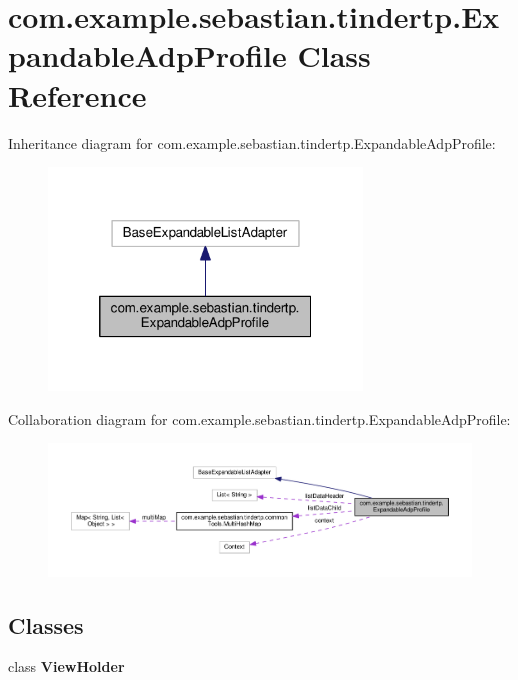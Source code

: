 \hypertarget{classcom_1_1example_1_1sebastian_1_1tindertp_1_1ExpandableAdpProfile}{}\section{com.\+example.\+sebastian.\+tindertp.\+Expandable\+Adp\+Profile Class Reference}
\label{classcom_1_1example_1_1sebastian_1_1tindertp_1_1ExpandableAdpProfile}


Inheritance diagram for com.\+example.\+sebastian.\+tindertp.\+Expandable\+Adp\+Profile\+:\nopagebreak
\begin{figure}[H]
\begin{center}
\leavevmode
\includegraphics[width=236pt]{classcom_1_1example_1_1sebastian_1_1tindertp_1_1ExpandableAdpProfile__inherit__graph}
\end{center}
\end{figure}


Collaboration diagram for com.\+example.\+sebastian.\+tindertp.\+Expandable\+Adp\+Profile\+:\nopagebreak
\begin{figure}[H]
\begin{center}
\leavevmode
\includegraphics[width=350pt]{classcom_1_1example_1_1sebastian_1_1tindertp_1_1ExpandableAdpProfile__coll__graph}
\end{center}
\end{figure}
\subsection*{Classes}
\begin{DoxyCompactItemize}
\item 
class {\bfseries View\+Holder}
\end{DoxyCompactItemize}

